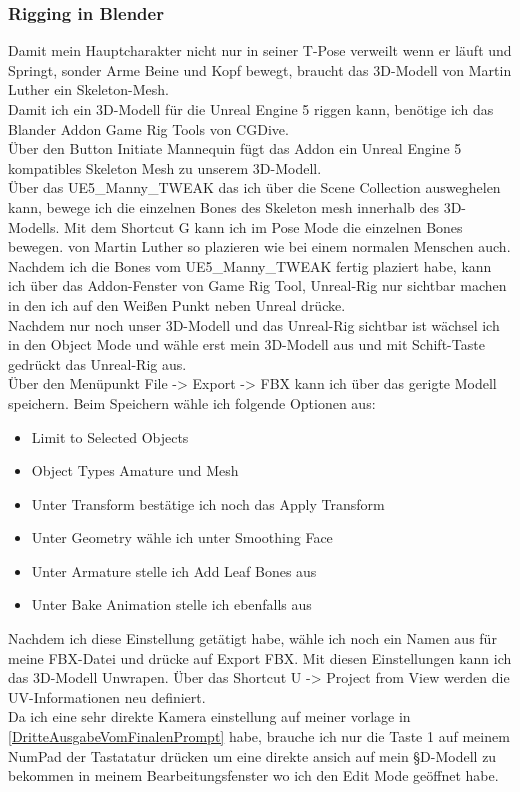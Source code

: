 \documentclass[10pt,a4paper,bibliography=totocnumbered,listof=totocnumbered]{scrartcl}
\begin{document}
\subsubsection{Rigging in Blender}%
Damit mein Hauptcharakter nicht nur in seiner T-Pose verweilt wenn er läuft und Springt, sonder Arme Beine und Kopf bewegt, braucht das 3D-Modell von Martin Luther ein Skeleton-Mesh.
\\
Damit ich ein 3D-Modell für die Unreal Engine 5 riggen kann, benötige ich das Blander Addon Game Rig Tools von CGDive.
\\
Über den Button Initiate Mannequin fügt das Addon ein Unreal Engine 5 kompatibles Skeleton Mesh zu unserem 3D-Modell.
\\
Über das UE5\_Manny\_TWEAK das ich über die Scene Collection ausweghelen kann, bewege ich die einzelnen Bones des Skeleton mesh innerhalb des 3D-Modells. Mit dem Shortcut G kann ich im Pose Mode die einzelnen Bones bewegen. von Martin Luther so plazieren wie bei einem normalen Menschen auch.
\\
Nachdem ich die Bones vom UE5\_Manny\_TWEAK fertig plaziert habe, kann ich über das Addon-Fenster von Game Rig Tool, Unreal-Rig nur sichtbar machen in den ich auf den Weißen Punkt neben Unreal drücke. 
\\
Nachdem nur noch unser 3D-Modell und das Unreal-Rig sichtbar ist wächsel ich in den Object Mode und wähle erst mein 3D-Modell aus und mit Schift-Taste gedrückt das Unreal-Rig aus.
\\
Über den Menüpunkt File -> Export -> FBX kann ich über das gerigte Modell speichern. Beim Speichern wähle ich folgende Optionen aus:
\begin{itemize}
	\item Limit to Selected Objects 
	\item Object Types Amature und Mesh
	\item Unter Transform bestätige ich noch das Apply Transform
	\item Unter Geometry wähle ich unter Smoothing Face
	\item Unter Armature stelle ich Add Leaf Bones aus
	\item Unter Bake Animation stelle ich ebenfalls aus
\end{itemize}
Nachdem ich diese Einstellung getätigt habe, wähle ich noch ein Namen aus für meine FBX-Datei und drücke auf Export FBX.
%
%
%
%
%
%
%
Mit diesen Einstellungen kann ich das 3D-Modell Unwrapen. Über das Shortcut U -> Project from View werden die UV-Informationen neu definiert.
\\
Da ich eine sehr direkte Kamera einstellung auf meiner vorlage in \ref{DritteAusgabeVomFinalenPrompt} habe, brauche ich nur die Taste 1 auf meinem NumPad der Tastatatur drücken um eine direkte ansich auf mein §D-Modell zu bekommen in meinem Bearbeitungsfenster wo ich den Edit Mode geöffnet habe.
\end{document}
